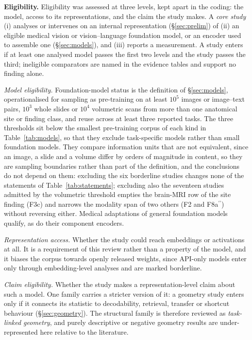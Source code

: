\textbf{Eligibility.} Eligibility was assessed at three levels, kept apart in the coding: the model,
access to its representations, and the claim the study makes. A \emph{core study} (i) analyses or
intervenes on an internal representation (\S\ref{sec:prelim}) of (ii) an eligible medical vision or
vision--language foundation model, or an encoder used to assemble one (\S\ref{sec:models}), and (iii)
reports a measurement. A study enters if at least one analysed model passes the first two levels and the
study passes the third; ineligible comparators are named in the evidence tables and support no finding
alone.

\emph{Model eligibility.} Foundation-model status is the definition of \S\ref{sec:models},
operationalised for sampling as pre-training on at least $10^{5}$ images or image--text pairs, $10^{3}$
whole slides or $10^{4}$ volumetric scans from more than one anatomical site or finding class, and reuse
across at least three reported tasks. The three thresholds sit below the smallest pre-training corpus of
each kind in Table~\ref{tab:models}, so that they exclude task-specific models rather than small
foundation models. They compare information units that are not equivalent, since an image, a slide and a
volume differ by orders of magnitude in content, so they are sampling boundaries rather than part of the
definition, and the conclusions do not depend on them: excluding the six borderline studies changes none
of the statements of Table~\ref{tab:statements}; excluding also the seventeen studies admitted by the
volumetric threshold empties the brain-MRI row of the site finding (F3c) and narrows the modality span of
two others (F2 and F8a$^{\prime\prime}$) without reversing either. Medical adaptations of general
foundation models qualify, as do their component encoders.

\emph{Representation access.} Whether the study could reach embeddings or activations at all. It is a
requirement of this review rather than a property of the model, and it biases the corpus towards openly
released weights, since API-only models enter only through embedding-level analyses and are marked
borderline.

\emph{Claim eligibility.} Whether the study makes a representation-level claim about such a model. One
family carries a stricter version of it: a geometry study enters only if it connects its statistic to
decodability, retrieval, transfer or shortcut behaviour (\S\ref{sec:geometry}). The structural family is
therefore reviewed as \emph{task-linked geometry}, and purely descriptive or negative geometry results
are under-represented here relative to the literature.

